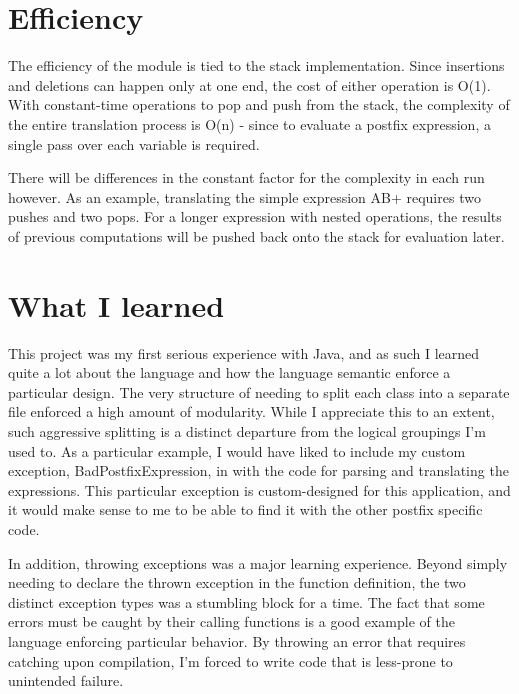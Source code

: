 \documentclass[a4paper,12pt]{article}
\begin{document}

\section*{Efficiency}
The efficiency of the module is tied to the stack implementation.  Since insertions and deletions can happen only at one end, 
the cost of either operation is O(1).  With constant-time operations to pop and push from the stack, the complexity of the 
entire translation process is O(n) - since to evaluate a postfix expression, a single pass over each variable is required.

There will be differences in the constant factor for the complexity in each run however.  As an example, translating the simple expression
AB+ requires two pushes and two pops.  For a longer expression with nested operations, the results of previous computations will
be pushed back onto the stack for evaluation later. 


\section*{What I learned}
This project was my first serious experience with Java, and as such I learned quite a lot about the language and how the language 
semantic enforce a particular design.  The very structure of needing to split each class into a separate file enforced a high 
amount of modularity.  While I appreciate this to an extent, such aggressive splitting is a distinct departure from the logical 
groupings I'm used to.  As a particular example, I would have liked to include my custom exception, BadPostfixExpression, in 
with the code for parsing and translating the expressions.  This particular exception is custom-designed for this application, and it
would make sense to me to be able to find it with the other postfix specific code.

In addition, throwing exceptions was a major learning experience.  Beyond simply needing to declare the thrown exception in 
the function definition,  the two distinct exception types was a stumbling block for a time.  The fact that some errors must be caught by 
their calling functions is a good example of the language enforcing particular behavior.  By throwing an error that requires catching upon
compilation, I'm forced to write code that is less-prone to unintended failure.
\end{document}
